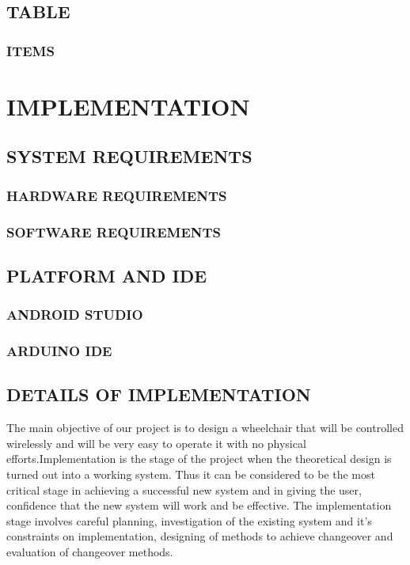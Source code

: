 \documentclass[11pt]{report} %
\begin{document}
\section{TABLE}
\label{sec:TABLE}

\subsection{ITEMS}
\label{subsec:ITEMS}


\chapter{IMPLEMENTATION}

\section{SYSTEM REQUIREMENTS}
\label{sec:SYSTEM REQUIREMENTS}


\subsection{HARDWARE REQUIREMENTS}
\label{subsec:HARDWARE REQUIREMENTS}


\subsection{SOFTWARE REQUIREMENTS}
\label{subsec:SOFTWARE REQUIREMENTS}

\section{PLATFORM AND IDE}
\label{sec:PLATFORM AND IDE}


\subsection{ANDROID STUDIO}
\label{subsec:ANDROID STUDIO}


\subsection{ARDUINO IDE}
\label{subsec:ARDUINO IDE}

\section{DETAILS OF IMPLEMENTATION}
\label{sec:DETAILS OF IMPLEMENTATION}

The main objective of our project is to design a wheelchair that will be controlled wirelessly and will be very easy to operate it with no physical efforts.Implementation is the stage of the project when the theoretical design is turned out into a working system. Thus it can be considered to be the most critical stage in achieving a successful new system and in giving the user, confidence that the new system will work and be effective.
The implementation stage involves careful planning, investigation of the existing system and it's constraints on implementation, designing of methods to achieve changeover and evaluation of changeover methods.
\end{document}
